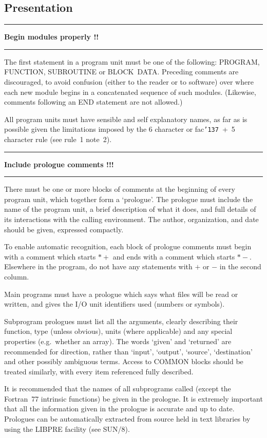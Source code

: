 \documentclass[twoside,11pt,nolof,noabs]{starlink}
\newcounter{sruleno}
\providecommand{\srule}[1]{
    \addtocounter{sruleno}{1}
    \goodbreak
    \rule{\textwidth}{0.3mm}
    \textbf{#1} \scpushright{ \textbf{\thesruleno}}
    \rule{\textwidth}{0.1mm}
}
\renewcommand{\_}{{\tt\char'137}}
\begin{document}
\goodbreak
\subsection{Presentation}

\srule{Begin modules properly !!}
The first statement in a program unit must be one of the
following: PROGRAM,
FUNCTION,
SUBROUTINE or
BLOCK~DATA.  Preceding comments are discouraged,
to avoid confusion (either to the reader or
to software) over where each new module begins in a concatenated
sequence of such modules.  (Likewise, comments following an
END statement are not allowed.)

All program units must have sensible and self explanatory
names, as far as is possible given the limitations imposed by the
6 character or fac\_~+~5 character rule (see rule~1 note~2).

\srule{Include prologue comments !!!}
There must be one or more blocks of comments at the beginning of every program
unit, which together form a `prologue'.
The prologue must include the name of the program unit, a brief description of
what it does, and full details of its interactions with the calling environment.
The author, organization, and date should be given, expressed compactly.

To enable automatic recognition,
each block of prologue comments
must begin with a comment which starts
$\ast+$ and ends with a comment which starts
$\ast-$.  Elsewhere in the program, do not have any statements with
$+$ or $-$ in the second column.

Main programs must have a prologue which says what files will
be read or written, and gives the I/O unit identifiers
used (numbers or symbols).

Subprogram prologues must list all the arguments, clearly describing their
function, type (unless obvious), units (where applicable) and any special
properties (e.g.\ whether an array).
The words `given' and `returned' are recommended for direction, rather than
`input', `output', `source', `destination' and other possibly ambiguous terms.
Access to COMMON blocks should be treated similarly, with every item referenced
fully described.

It is recommended that the names of all subprograms
called (except the Fortran~77 intrinsic functions) be given in the prologue.
It is extremely important that all the information given in the prologue is
accurate and up to date.
Prologues can be automatically extracted from source held in text
libraries by using the LIBPRE facility (see SUN/8).
\end{document}
